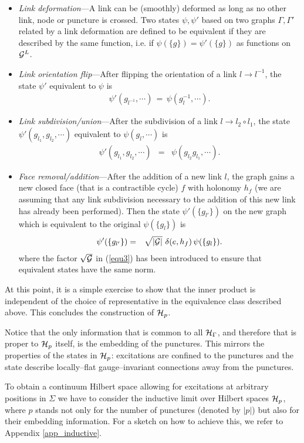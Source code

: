 \documentclass[nofootinbib,superscriptaddress,eqsecnum,tightenlines,11pt]{revtex4-1}
\def\ba{\begin{eqnarray}}
\def\ea{\end{eqnarray}}
\begin{document}
\begin{itemize}
\item[{\it i})]{\it Link deformation}---A link can be (smoothly) deformed as long as no other link, node or puncture is crossed. Two states $\psi,\psi'$ based on two graphs $\Gamma,\Gamma'$ related by a link deformation are defined to be equivalent if they are described by the same function, i.e. if $\psi(\{g\})=\psi'(\{g\})$ as functions on ${\cal G}^L$.

\item[{\it ii})]{\it Link orientation flip}---After flipping the orientation of a link $l \to l^{-1}$, the state $\psi'$ equivalent to $\psi$ is
\ba
	\label{equ1}
	\psi'( g_{l^{-1}}, \cdots) \,=\, \psi(g^{-1}_l,\cdots)  .
\ea

\item[{\it iii})] {\it Link subdivision/union}---After the subdivision of a link $l \to l_2 \circ l_1$, the state $\psi'(g_{l_1},g_{l_2}, \cdots)$ equivalent to $\psi(g_l, \cdots)$ is
\ba
	\label{equ2}
	\psi'(g_{l_1},g_{l_2}, \cdots)  &=& \psi( g_{l_2} g_{l_1}, \cdots)   .
\ea

\item[{\it iv})]{\it Face removal/addition}---After the addition of a new link $l$, the graph gains a new closed face (that is a contractible cycle) $f$ with holonomy $h_f$ (we are assuming that any link subdivision necessary to the addition of this new link has already been performed). Then the state $\psi'(\{g_{l'}\})$ on the new graph which is equivalent to the original $\psi(\{g_l\})$ is
\ba
	\label{equ3}
	\psi'( \{g_{l'}\}) &=& \sqrt{|{\cal G}|} \,\, \delta(e, h_f) \, \psi( \{g_l\})  .
\ea
where the factor $\sqrt{{\cal G}}$ in (\ref{equ3}) has been introduced to ensure that equivalent states have the same norm. 
\end{itemize}

At this point, it is a simple exercise to show that the inner product is independent of the choice of representative in the equivalence class described above.
This concludes the construction of ${\cal H}_p$.

Notice that the only information that is common to all ${\cal H}_\Gamma$, and therefore that is proper to ${\cal H}_p$ itself, is the embedding of the punctures.
This mirrors the properties of the states in ${\cal H}_p$: excitations are confined to the punctures and the state describe locally--flat gauge--invariant connections away from the punctures. 

To obtain a continuum Hilbert space allowing for excitations at arbitrary positions in $\Sigma$ we have to consider the inductive limit over Hilbert spaces ${\cal H}_p$, where $p$ stands not only for the number of punctures (denoted by $|p|$) but also for their embedding information. 
For a sketch on how to achieve this, we refer to Appendix \ref{app_inductive}.
\end{document}
